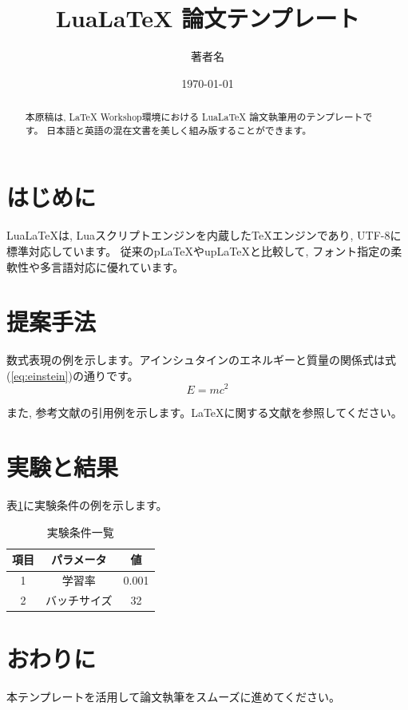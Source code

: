 \documentclass[autodetect-engine, ja=standard, a4paper, 10pt]{bxjsarticle}
\title{LuaLaTeX 論文テンプレート}
\author{著者名}
\date{\today}
\begin{document}
\maketitle

\begin{abstract}
本原稿は, LaTeX Workshop環境における LuaLaTeX 論文執筆用のテンプレートです。
日本語と英語の混在文書を美しく組み版することができます。
\end{abstract}

\section{はじめに}
LuaLaTeXは, Luaスクリプトエンジンを内蔵したTeXエンジンであり, UTF-8に標準対応しています。
従来のpLaTeXやupLaTeXと比較して, フォント指定の柔軟性や多言語対応に優れています。

\section{提案手法}
数式表現の例を示します。アインシュタインのエネルギーと質量の関係式は式(\ref{eq:einstein})の通りです。
\begin{equation}
    E = m c^2
    \label{eq:einstein}
\end{equation}

また, 参考文献の引用例を示します。LaTeXに関する文献\cite{lamport1994latex}を参照してください。

\section{実験と結果}
表\ref{tab:example}に実験条件の例を示します。

\begin{table}[htbp]
    \centering
    \caption{実験条件一覧}
    \label{tab:example}
    \begin{tabular}{ccc}
        \toprule
        項目 & パラメータ & 値 \\
        \midrule
        1 & 学習率 & 0.001 \\
        2 & バッチサイズ & 32 \\
        \bottomrule
    \end{tabular}
\end{table}

\section{おわりに}
本テンプレートを活用して論文執筆をスムーズに進めてください。



\end{document}
